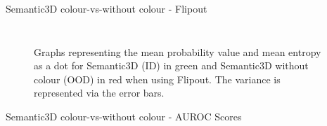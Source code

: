 \documentclass[aspectratio=169]{beamer}
\begin{document}
\begin{frame}{Semantic3D colour-vs-without colour - Flipout}
\begin{columns}
\begin{column}{0.5\textwidth}
\begin{figure}
            \end{figure}
        \end{column}
    \end{columns}
    \begin{figure}
        \caption{Graphs representing the mean probability value and mean entropy as a dot for Semantic3D (ID) in green and
        Semantic3D without colour (OOD) in red when using Flipout. The variance is represented via the error bars.}
    \end{figure}
\end{frame}

\begin{frame}{Semantic3D colour-vs-without colour - AUROC Scores}
    \begin{table}[h!]
\end{table}
\end{frame}
\end{document}
